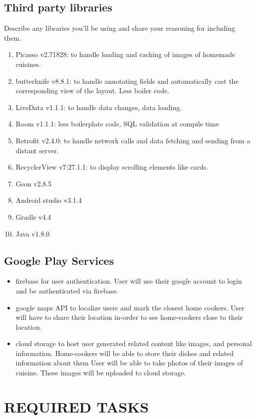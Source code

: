 \documentclass{article}
\begin{document}
\subsection{Third party libraries}
  Describe any libraries you’ll be using and share your reasoning for including them.

  \begin{enumerate}
    \item Picasso v2.71828: to handle loading and caching of images of homemade cuisines. 
    \item butterknife v8.8.1: to handle annotating fields and automatically cast the corresponding view of the layout. Less boiler code.
    \item LiveData v1.1.1: to handle data changes, data loading.
    \item Room v1.1.1: less boilerplate code, SQL validation at compile time 
    \item Retrofit v2.4.0: to handle network calls and data fetching and sending from a distant server.
    \item RecyclerView v7:27.1.1: to display scrolling elements like cards.
    \item Gson v2.8.5
    \item Android studio v3.1.4
    \item Gradle v4.4
    \item Java v1.8.0
  \end{enumerate}


\subsection{Google Play Services}
  \begin{itemize}
    \item firebase for user authentication. User will use their google account to login and be authenticated via firebase.
    \item google maps API to localize users and mark the closest home cookers. User will have to share their location in-order to see home-cookers close to their location.
    \item cloud storage to host user generated related content like images, and personal information. Home-cookers will be able to store their dishes and related information about them User will be able to take photos of their images of cuisine. These images will be uploaded to cloud storage.
  \end{itemize}

\section{REQUIRED TASKS}
\end{document}

